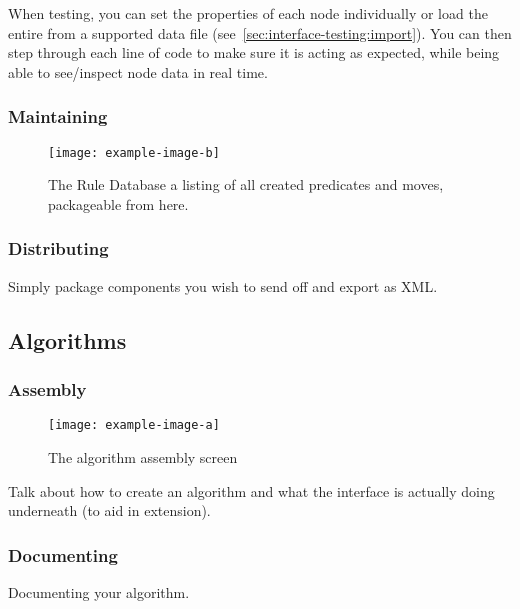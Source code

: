 When testing, you can set the properties of each node individually
  or load the entire from a supported data file (see~\autoref{sec:interface-testing:import}).
You can then step through each line of code to make sure it is acting as expected,
  while being able to see\slash inspect node data in real time.

\subsubsection{Maintaining}
\begin{figure}
  \centering
  \texttt{[image: example-image-b]}
  \caption{The Rule Database \Dash
    a listing of all created predicates and moves,
    packageable from here.}
  \label{fig:iface:ruledb}
\end{figure}
\subsubsection{Distributing}
\begin{draftvspace}{1in}
  Simply package components you wish to send off and export as XML.
\end{draftvspace}

\subsection{Algorithms}

\subsubsection{Assembly}
\begin{figure}
  \centering
  \texttt{[image: example-image-a]}
  \caption{The algorithm assembly screen}
  \label{fig:iface:alg-asm}
\end{figure}
\begin{draftvspace}{3in}
  Talk about how to create an algorithm and
    what the interface is actually doing underneath
    (to aid in extension).
\end{draftvspace}
\subsubsection{Documenting}
\begin{draftvspace}{2in}
  Documenting your algorithm.
\end{draftvspace}
